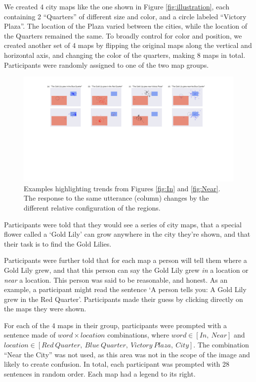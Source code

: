 \documentclass[10pt,letterpaper]{article}
\begin{document}
We created 4 city maps like the one shown in Figure \ref{fig:illustration}, each containing 2 ``Quarters'' of different size and color, and a circle labeled ``Victory Plaza''. The location of the Plaza varied between the cities, while the location of the Quarters remained the same. To broadly control for color and position, we created another set of 4 maps by flipping the original maps along the vertical and horizontal axis, and changing the color of the quarters, making 8 maps in total. Participants were randomly assigned to one of the two map groups. 

\begin{figure}[!t]
\center
\includegraphics[width=\textwidth]{figures/results1.pdf}
\caption{Examples highlighting trends from Figures \ref{fig:In} and \ref{fig:Near}. The response to the same utterance (column) changes by the different relative configuration of the regions.}
\label{fig:zoomIn}
\end{figure}

Participants were told that they would see a series of city maps, that a special flower called a `Gold Lily' can grow anywhere in the city they're shown, and that their task is to find the Gold Lilies. 

Participants were further told that for each map a person will tell them where a Gold Lily grew, and that this person can say the Gold Lily grew \textit{in} a location or \textit{near} a location. This person was said to be reasonable, and honest. As an example, a participant might read the sentence `A person tells you: A Gold Lily grew in the Red Quarter'. Participants made their guess by clicking directly on the maps they were shown.

For each of the 4 maps in their group, participants were prompted with a sentence made of $word \times location$ combinations, where $word \in [In,\ Near]$ and $location \in [Red\ Quarter,\ Blue\ Quarter,\ Victory\ Plaza,\ City]$. The combination ``Near the City'' was not used, as this area was not in the scope of the image and likely to create confusion. In total, each participant was prompted with 28 sentences in random order. Each map had a legend to its right. 
\end{document}
